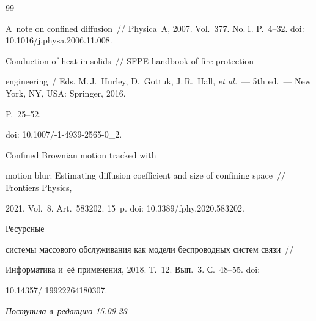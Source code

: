 {{\begin{thebibliography}{99}


 A~note on confined diffusion~/\!\!/  Physica~A, 2007. Vol.~377. No.\,1. P.~4--32. doi: 10.1016/j.physa.2006.11.008.







 Conduction of heat in solids~/\!\!/ SFPE handbook of fire protection 


engineering~/ Eds. M.\,J.~Hurley, D.~Gottuk, J.\,R.~Hall, \textit{et al.}~--- 5th ed.~--- New York, NY, USA: Springer, 2016. 


P.~25--52.  


doi: 10.1007\!/-1-4939-2565-0\_2.







Confined Brownian motion tracked with 


motion blur: Estimating diffusion coefficient and size of confining space~/\!\!/ Frontiers Physics, 


2021. Vol.~8. Art.~583202. 15~p. doi: 10.3389\!/\!fphy.2020.583202.




 Ресурсные 


системы массового обслуживания как модели беспроводных сис\-тем связи~/\!\!/  


Информатика и~её применения, 2018. Т.~12. Вып.~3. С.~48--55. doi: 


10.14357\!/ 19922264180307.


   \end{thebibliography}


} }











\vspace*{-6pt}





\hfill{\small\textit{Поступила в~редакцию 15.09.23}}





\vspace*{8pt}





